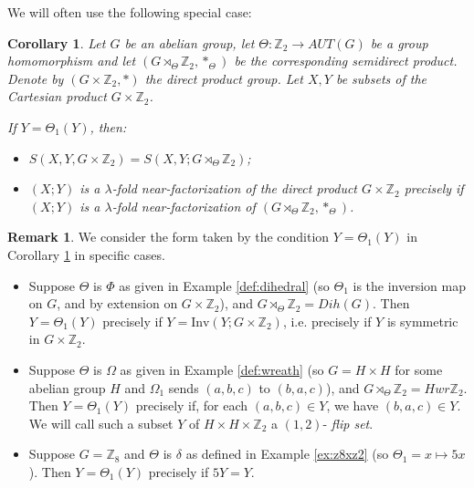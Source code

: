 \documentclass[12pt, a4paper]{article}
\newtheorem{corollary}[theorem]{Corollary}
\theoremstyle{definition}
\newtheorem{remark}[theorem]{Remark}
\begin{document}
We will often use the following special case:
\begin{corollary}\label{cor:gamma_triv}
Let $G$ be an abelian group, let $\Theta: \mathbb{Z}_2 \rightarrow AUT(G)$ be a group homomorphism and let $(G \rtimes_{\Theta} \mathbb{Z}_2,*_{\Theta})$ be the corresponding semidirect product. Denote by $(G \times \mathbb{Z}_2,*)$ the direct product group. Let $X,Y$ be subsets of the Cartesian product $G \times \mathbb{Z}_2$.

If $Y=\Theta_1(Y)$, then:
\begin{itemize}
\item[(i)] $S(X, Y,G \times \mathbb{Z}_2)=S(X,Y; G \rtimes_{\Theta} \mathbb{Z}_2)$;
\item[(ii)] $(X;Y)$ is a $\lambda$-fold near-factorization of the direct product $G \times \mathbb{Z}_2$ precisely if $(X;Y)$ is a $\lambda$-fold near-factorization of $(G \rtimes_{\Theta} \mathbb{Z}_2,*_{\Theta})$.
\end{itemize}
\end{corollary}


\begin{remark}\label{rem:Y=theta1Y}
We consider the form taken by the condition $Y=\Theta_1(Y)$ in Corollary \ref{cor:gamma_triv} in specific cases.
\begin{itemize}
\item Suppose $\Theta$ is $\Phi$ as given in Example \ref{def:dihedral} (so $\Theta_1$ is the inversion map on $G$, and by extension on $G \times \mathbb{Z}_2$), and $G \rtimes_{\Theta} \mathbb{Z}_2=Dih(G)$.  Then $Y=\Theta_1(Y)$ precisely if $Y=\mathrm{Inv}(Y;G \times \mathbb{Z}_2)$, i.e. precisely if $Y$ is symmetric in $G \times \mathbb{Z}_2$.
\item Suppose $\Theta$ is $\Omega$ as given in Example \ref{def:wreath} (so $G=H \times H$ for some abelian group $H$ and $\Omega_1$ sends $(a,b,c)$ to $(b,a,c)$), and $G \rtimes_{\Theta} \mathbb{Z}_2=H wr\mathbb{Z}_2$. Then $Y=\Theta_1(Y)$ precisely if, for each $(a,b,c) \in Y$, we have $(b,a,c) \in Y$. We will call such a subset $Y$ of $H \times H \times \mathbb{Z}_2$ a $(1,2)$- \emph{flip set}.
\item Suppose $G=\mathbb{Z}_8$ and $\Theta$ is $\delta$ as defined in Example \ref{ex:z8xz2} (so $\Theta_1=x \mapsto 5x$).  Then $Y=\Theta_1(Y)$ precisely if $5Y=Y$.
\end{itemize}
\end{remark}
\end{document}
